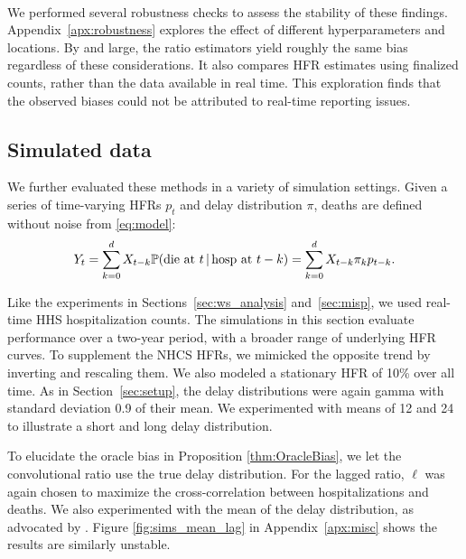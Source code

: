 \documentclass{article}
\newcommand{\given}{\, \vert \,}
\begin{document}
\paragraph{}

We performed several robustness checks to assess the stability of these findings. Appendix~\ref{apx:robustness} explores the effect of different hyperparameters and locations. By and large, the ratio estimators yield roughly the same bias regardless of these considerations. It also compares HFR estimates using finalized counts, rather than the data available in real time. This exploration finds that the observed biases could not be attributed to real-time reporting issues. 

\subsection{Simulated data}\label{sec:results_sim}

We further evaluated these methods in a variety of simulation settings. Given a series of time-varying HFRs $p_t$ and delay distribution $\pi$, deaths are defined without noise from \eqref{eq:model}:
$$Y_t = \sum_{k=0}^d X_{t-k} \P(\text{die at $t$}\given\text{hosp at }t-k) = \sum_{k=0}^d X_{t-k} \pi_k p_{t-k}.$$

Like the experiments in Sections~\ref{sec:ws_analysis} and~\ref{sec:misp}, we
used real-time HHS hospitalization counts. The simulations in this
section evaluate performance over a two-year period, with a broader range of
underlying HFR curves. To supplement the NHCS HFRs, we mimicked the opposite
trend by inverting and rescaling them. We also modeled a stationary HFR of 10\%
over all time. As in Section~\ref{sec:setup}, the delay distributions were again
gamma with standard deviation 0.9 of their mean. We experimented with means of
12 and 24 to illustrate a short and long delay distribution. 

To elucidate the oracle bias in Proposition \ref{thm:OracleBias}, we let the convolutional ratio use the true delay distribution. For the lagged ratio, $\ell$ was again chosen to maximize the cross-correlation between hospitalizations and deaths. We also experimented with the mean of the delay distribution, as advocated by \citet{lagged_chinese}. Figure \ref{fig:sims_mean_lag} in Appendix~\ref{apx:misc} shows the results are similarly unstable.
\end{document}
